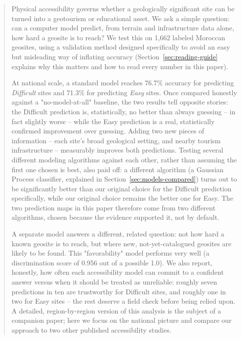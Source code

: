 \documentclass[11pt,a4paper]{article}
\begin{document}
\begin{abstract}
\noindent\small
Physical accessibility governs whether a geologically significant site can be turned into a geotourism or educational asset. We ask a simple question: can a computer model predict, from terrain and infrastructure data alone, how hard a geosite is to reach? We test this on 1{,}662 labeled Moroccan geosites, using a validation method designed specifically to avoid an easy but misleading way of inflating accuracy (Section~\ref{sec:reading-guide} explains why this matters and how to read every number in this paper).

At national scale, a standard model reaches 76.7\% accuracy for predicting \emph{Difficult} sites and 71.3\% for predicting \emph{Easy} sites. Once compared honestly against a "no-model-at-all" baseline, the two results tell opposite stories: the Difficult prediction is, statistically, no better than always guessing -- in fact slightly worse -- while the Easy prediction is a real, statistically confirmed improvement over guessing. Adding two new pieces of information -- each site's broad geological setting, and nearby tourism infrastructure -- measurably improves both predictions. Testing several different modeling algorithms against each other, rather than assuming the first one chosen is best, also paid off: a different algorithm (a Gaussian Process classifier, explained in Section~\ref{sec:models-compared}) turns out to be significantly better than our original choice for the Difficult prediction specifically, while our original choice remains the better one for Easy. The two prediction maps in this paper therefore come from two different algorithms, chosen because the evidence supported it, not by default.

A separate model answers a different, related question: not how hard a known geosite is to reach, but where new, not-yet-catalogued geosites are likely to be found. This "favorability" model performs very well (a discrimination score of 0.956 out of a possible 1.0). We also report, honestly, how often each accessibility model can commit to a confident answer versus when it should be treated as unreliable: roughly seven predictions in ten are trustworthy for Difficult sites, and roughly one in two for Easy sites -- the rest deserve a field check before being relied upon. A detailed, region-by-region version of this analysis is the subject of a companion paper; here we focus on the national picture and compare our approach to two other published accessibility studies.
\end{abstract}
\end{document}
